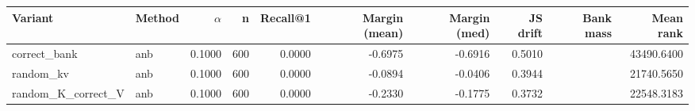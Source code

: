 \begin{tabular}{l l r r r r r r r r}
\toprule
Variant & Method & $\alpha$ & n & Recall@1 & Margin (mean) & Margin (med) & JS drift & Bank mass & Mean rank \\
\midrule
correct\_bank & anb & 0.1000 & 600 & 0.0000 & -0.6975 & -0.6916 & 0.5010 &  & 43490.6400 \\
random\_kv & anb & 0.1000 & 600 & 0.0000 & -0.0894 & -0.0406 & 0.3944 &  & 21740.5650 \\
random\_K\_correct\_V & anb & 0.1000 & 600 & 0.0000 & -0.2330 & -0.1775 & 0.3732 &  & 22548.3183 \\
\bottomrule
\end{tabular}
